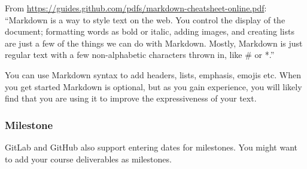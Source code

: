 \documentclass[11pt, oneside]{article}   	%
\begin{document}
From \href{https://guides.github.com/pdfs/markdown-cheatsheet-online.pdf}{https://guides.github.com/pdfs/markdown-cheatsheet-online.pdf}:
``Markdown is a way to style text on the web. You control the display of the
document; formatting words as bold or italic, adding images, and creating lists
are just a few of the things we can do with Markdown. Mostly, Markdown is just
regular text with a few non-alphabetic characters thrown in, like \# or *.''

You can use Markdown syntax to add headers, lists, emphasis, emojis etc.  When
you get started Markdown is optional, but as you gain experience, you will
likely find that you are using it to improve the expressiveness of your text.

\subsubsection{Milestone}

GitLab and GitHub also support entering dates for milestones.  You might want to
add your course deliverables as milestones.
\end{document}
